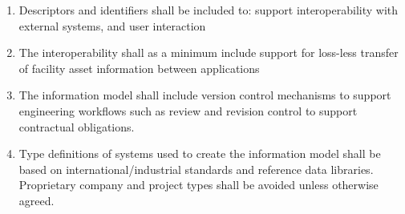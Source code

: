 \documentclass[../main.tex]{subfiles}
\begin{document}
\begin{enumerate}
  \item Descriptors and identifiers shall be included to: support interoperability with external systems, and user
        interaction
  \item The interoperability shall as a minimum include support for loss-less transfer of facility asset information
        between applications
  \item The information model shall include version control mechanisms to support engineering workflows such as review
        and revision control to support contractual obligations.
  \item Type definitions of systems used to create the information model shall be based on international/industrial
        standards and reference data libraries. Proprietary company and project types shall be avoided unless otherwise
        agreed.
\end{enumerate}
\end{document}
